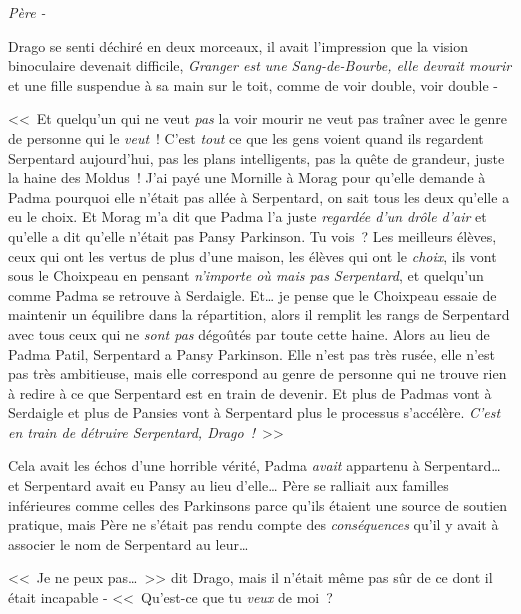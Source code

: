 \emph{Père -}

Drago se senti déchiré en deux morceaux, il avait l'impression que la vision binoculaire devenait difficile, \emph{Granger est une Sang-de-Bourbe, elle devrait mourir} et une fille suspendue à sa main sur le toit, comme de voir double, voir double -

<<~Et quelqu'un qui ne veut \emph{pas} la voir mourir ne veut pas traîner avec le genre de personne qui le \emph{veut}~! C'est \emph{tout} ce que les gens voient quand ils regardent Serpentard aujourd'hui, pas les plans intelligents, pas la quête de grandeur, juste la haine des Moldus~! J'ai payé une Mornille à Morag pour qu'elle demande à Padma pourquoi elle n'était pas allée à Serpentard, on sait tous les deux qu'elle a eu le choix. Et Morag m'a dit que Padma l'a juste \emph{regardée d'un drôle d'air} et qu'elle a dit qu'elle n'était pas Pansy Parkinson. Tu vois~? Les meilleurs élèves, ceux qui ont les vertus de plus d'une maison, les élèves qui ont le \emph{choix}, ils vont sous le Choixpeau en pensant \emph{n'importe où mais pas Serpentard}, et quelqu'un comme Padma se retrouve à Serdaigle. Et… je pense que le Choixpeau essaie de maintenir un équilibre dans la répartition, alors il remplit les rangs de Serpentard avec tous ceux qui ne \emph{sont pas} dégoûtés par toute cette haine. Alors au lieu de Padma Patil, Serpentard a Pansy Parkinson. Elle n'est pas très rusée, elle n'est pas très ambitieuse, mais elle correspond au genre de personne qui ne trouve rien à redire à ce que Serpentard est en train de devenir. Et plus de Padmas vont à Serdaigle et plus de Pansies vont à Serpentard plus le processus s'accélère. \emph{C'est en train de détruire Serpentard, Drago~!}~>>

Cela avait les échos d'une horrible vérité, Padma \emph{avait} appartenu à Serpentard… et Serpentard avait eu Pansy au lieu d'elle… Père se ralliait aux familles inférieures comme celles des Parkinsons parce qu'ils étaient une source de soutien pratique, mais Père ne s'était pas rendu compte des \emph{conséquences} qu'il y avait à associer le nom de Serpentard au leur…

<<~Je ne peux pas…~>> dit Drago, mais il n'était même pas sûr de ce dont il était incapable - <<~Qu'est-ce que tu \emph{veux} de moi~?

